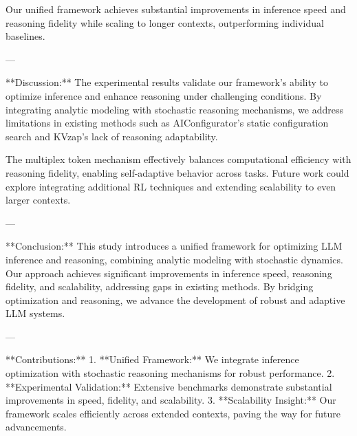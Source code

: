 Our unified framework achieves substantial improvements in inference speed and reasoning fidelity while scaling to longer contexts, outperforming individual baselines.  

---

**Discussion:**  
The experimental results validate our framework’s ability to optimize inference and enhance reasoning under challenging conditions. By integrating analytic modeling with stochastic reasoning mechanisms, we address limitations in existing methods such as AIConfigurator’s static configuration search and KVzap’s lack of reasoning adaptability.  

The multiplex token mechanism effectively balances computational efficiency with reasoning fidelity, enabling self-adaptive behavior across tasks. Future work could explore integrating additional RL techniques and extending scalability to even larger contexts.  

---

**Conclusion:**  
This study introduces a unified framework for optimizing LLM inference and reasoning, combining analytic modeling with stochastic dynamics. Our approach achieves significant improvements in inference speed, reasoning fidelity, and scalability, addressing gaps in existing methods. By bridging optimization and reasoning, we advance the development of robust and adaptive LLM systems.  

---

**Contributions:**  
1. **Unified Framework:** We integrate inference optimization with stochastic reasoning mechanisms for robust performance.  
2. **Experimental Validation:** Extensive benchmarks demonstrate substantial improvements in speed, fidelity, and scalability.  
3. **Scalability Insight:** Our framework scales efficiently across extended contexts, paving the way for future advancements.  


